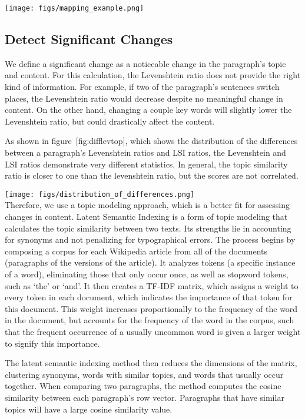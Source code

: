 \texttt{[image: figs/mapping\_example.png]}\\

\subsection{Detect Significant
Changes}\label{detect-significant-changes}

We define a significant change as a noticeable change in the paragraph's
topic and content. For this calculation, the Levenshtein ratio does not
provide the right kind of information. For example, if two of the
paragraph's sentences switch places, the Levenshtein ratio would
decrease despite no meaningful change in content. On the other hand,
changing a couple key words will slightly lower the Levenshtein ratio,
but could drastically affect the content.

As shown in figure~{[}fig:difflevtop{]}, which shows the distribution of
the differences between a paragraph's Levenshtein ratios and LSI ratios,
the Levenshtein and LSI ratios demonstrate very different statistics. In
general, the topic similarity ratio is closer to one than the
levenshtein ratio, but the scores are not correlated.

\texttt{[image: figs/distribution\_of\_differences.png]}\\

Therefore, we use a topic modeling approach, which is a better fit for
assessing changes in content. Latent Semantic Indexing
\cite{deerwester1990indexing} is a form of topic modeling that
calculates the topic similarity between two texts. Its strengths lie in
accounting for synonyms and not penalizing for typographical errors. The
process begins by composing a corpus for each Wikipedia article from all
of the documents (paragraphs of the versions of the article). It
analyzes tokens (a specific instance of a word), eliminating those that
only occur once, as well as stopword tokens, such as `the' or `and'. It
then creates a TF-IDF matrix, which assigns a weight to every token in
each document, which indicates the importance of that token for this
document. This weight increases proportionally to the frequency of the
word in the document, but accounts for the frequency of the word in the
corpus, such that the frequent occurrence of a usually uncommon word is
given a larger weight to signify this importance.

The latent semantic indexing method then reduces the dimensions of the
matrix, clustering synonyms, words with similar topics, and words that
usually occur together. When comparing two paragraphs, the method
computes the cosine similarity between each paragraph's row vector.
Paragraphs that have similar topics will have a large cosine similarity
value.

